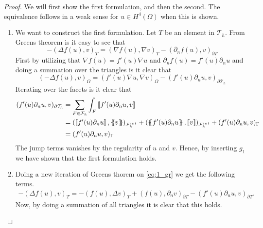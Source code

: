 \begin{proof}

    We will first show the first formulation, and then the second. The equivalence follows in a weak sense for $u \in H^{4}( \Omega ) $  when this is shown.
    \begin{enumerate}[label=\arabic*)]
        \item We want to construct the first formulation. Let $T$ be an element in $\mathcal{T}_{h}$. From Greens theorem is it easy to see that
            \begin{equation}
            \label{eq:1_gr}
-(\Delta f( u) , v)_{T } = (\nabla f( u), \nabla v  )_{T } - ( \partial _{n}  f( u), v )_{\partial T }
            \end{equation}
            First by utilizing that $\nabla f( u) = f' ( u) \nabla u $ and $\partial _{n}f( u)  = f' ( u)  \partial _{n}u$  and doing a summation over the triangles  is it clear that \[
            ( -\Delta f( u),v )_{\Omega  } =(f' ( u) \nabla u, \nabla v  )_{\Omega  } - (   f' ( u)\partial _{n}u, v )_{\partial \mathcal{T}_{h}  }
            \]
            Iterating over the facets is it clear that \[
                \begin{split}
            (   f' ( u)\partial _{n}u, v )_{\partial \mathcal{T}_{h}  } & = \sum_{F \in \mathcal{F}_{h}  }^{} \int_{F}^{}   \jump{ f' ( u)\partial _{n}u, v } \\
                                                                        & =  ( \jump{ f' ( u) \partial _{n}u },  \mean{v}    )_{\mathcal{F}^{int}_{h} } + ( \mean{ f' ( u) \partial _{n}u }, \jump{ v }    )_{\mathcal{F}^{int}_{h} } +  ( f' ( u) \partial _{n}u, v) _{\Gamma } \\
                                                                        & =  ( f' ( u) \partial _{n}u, v) _{\Gamma }
                \end{split}
            \]
            The jump terms vanishes by the regularity of $u$ and $v$. Hence, by inserting $g_{1}$ we have shown that the first formulation holds.
        \item  Doing a new iteration of Greens thorem on \eqref{eq:1_gr} we get the following terms.
\[
    \begin{split}
-(\Delta f( u) , v)_{T }  = -( f( u), \Delta v )_{T} + (f( u), \partial _{n} v  )_{\partial T} - (   f'( u)\partial _{n}u, v )_{\partial T } .
    \end{split}
\]
Now, by doing a summation of all triangles it is clear that this holds.
\begin{equation}

\end{equation}
\end{enumerate}
\end{proof}
